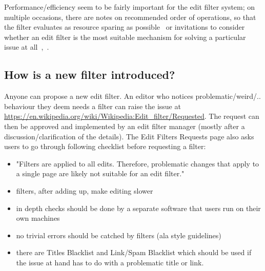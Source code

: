 Performance/efficiency seem to be fairly important for the edit filter system;
on multiple occasions, there are notes on recommended order of operations, so that the filter evaluates as resource sparing as possible~\cite{Wikipedia:EditFilterInstructions} or invitations to consider whether an edit filter is the most suitable mechanism for solving a particular issue at all~\cite{Wikipedia:EditFilter},~\cite{Wikipedia:EditFilterRequested}.

\subsection{How is a new filter introduced?}

Anyone can propose a new edit filter.
An editor who notices problematic/weird/.. behaviour they deem needs a filter can raise the issue at \url{https://en.wikipedia.org/wiki/Wikipedia:Edit_filter/Requested}.
The request can then be approved and implemented by an edit filter manager (mostly after a discussion/clarification of the details).
The Edit Filters Requests page also asks users to go through following checklist before requesting a filter:
\begin{itemize}
    \item "Filters are applied to all edits. Therefore, problematic changes that apply to a single page are likely not suitable for an edit filter."
    \item filters, after adding up, make editing slower
    \item in depth checks should be done by a separate software that users run on their own machines
    \item no trivial errors should be catched by filters (ala style guidelines)
    \item there are Titles Blacklist and Link/Spam Blacklist which should be used if the issue at hand has to do with a problematic title or link.
\end{itemize}

